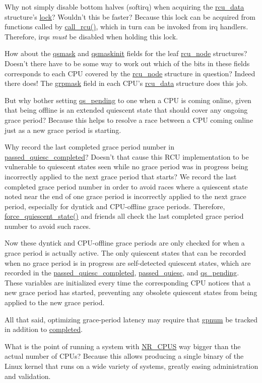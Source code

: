 \QuickQ{}
	Why not simply disable bottom halves (softirq) when acquiring
	the \url{rcu_data} structure's \url{lock}?
	Wouldn't this be faster?
\QuickA{}
	Because this lock can be acquired from functions
	called by \url{call_rcu()}, which in turn can be
	invoked from irq handlers.
	Therefore, irqs \emph{must} be disabled when
	holding this lock.

\QuickQ{}
	How about the \url{qsmask} and \url{qsmaskinit}
	fields for the leaf \url{rcu_node} structures?
	Doesn't there have to be some way to work out
	which of the bits in these fields corresponds
	to each CPU covered by the \url{rcu_node} structure
	in question?
\QuickA{}
	Indeed there does!
	The \url{grpmask} field in each CPU's \url{rcu_data}
	structure does this job.

\QuickQ{}
	But why bother setting \url{qs_pending} to one when a CPU
	is coming online, given that being offline is an extended
	quiescent state that should cover any ongoing grace period?
\QuickA{}
	Because this helps to resolve a race between a CPU coming online
	just as a new grace period is starting.

\QuickQ{}
	Why record the last completed grace period number in
	\url{passed_quiesc_completed}?
	Doesn't that cause this RCU implementation to be vulnerable
	to quiescent states seen while no grace period was in progress
	being incorrectly applied to the next grace period that starts?
\QuickA{}
	We record the last completed grace period number in order
	to avoid races where a quiescent state noted near the end of
	one grace period is incorrectly applied to the next grace
	period, especially for dyntick and CPU-offline grace periods.
	Therefore, \url{force_quiescent_state()} and friends all
	check the last completed grace period number to avoid such races.

	Now these dyntick and CPU-offline grace periods are only checked
	for when a grace period is actually active.
	The only quiescent states that can be recorded when no grace
	period is in progress are self-detected quiescent states,
	which are recorded in the \url{passed_quiesc_completed},
	\url{passed_quiesc}, and \url{qs_pending}.
	These variables are initialized every time the corresponding
	CPU notices that a new grace period has started, preventing
	any obsolete quiescent states from being applied to the
	new grace period.

	All that said, optimizing grace-period latency may require that
	\url{gpnum} be tracked in addition to \url{completed}.

\QuickQ{}
	What is the point of running a system with \url{NR_CPUS}
	way bigger than the actual number of CPUs?
\QuickA{}
	Because this allows producing a single binary of the Linux kernel
	that runs on a wide variety of systems, greatly easing administration
	and validation.

